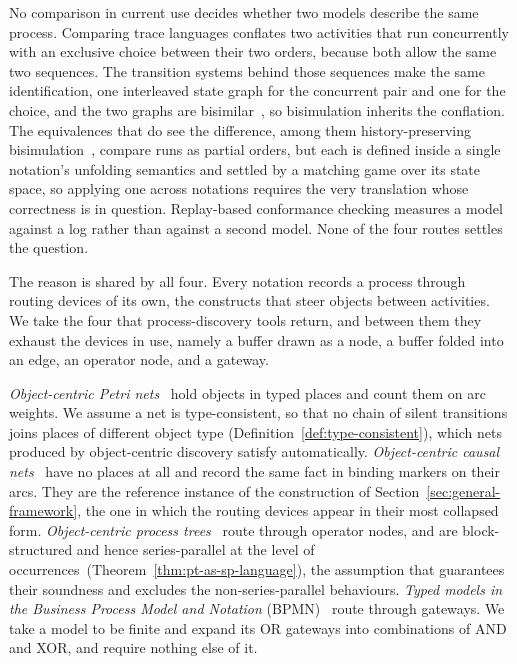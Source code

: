 No comparison in current use decides whether two models describe the same process. Comparing
trace languages conflates two activities that run concurrently with an exclusive choice between
their two orders, because both allow the same two sequences. The transition systems behind those
sequences make the same identification, one interleaved state graph for the concurrent pair and
one for the choice, and the two graphs are
bisimilar~\cite{sassoneModelsConcurrencyClassification1996}, so bisimulation inherits the
conflation. The equivalences that do see the difference, among them history-preserving
bisimulation~\cite{vanglabbeekRefinementActionsEquivalence2001}, compare runs as partial orders,
but each is defined inside a single notation's unfolding semantics and settled by a matching game
over its state space, so applying one across notations requires the very translation whose
correctness is in question. Replay-based conformance checking measures a model against a log
rather than against a second model. None of the four routes settles the question.

The reason is shared by all four. Every notation records a process through routing devices of its
own, the constructs that steer objects between activities. We take the four that
process-discovery tools return, and between them they exhaust the devices in use, namely a buffer drawn
as a node, a buffer folded into an edge, an operator node, and a gateway.

\emph{Object-centric Petri nets}~\cite{vanderaalstDiscoveringObjectCentricPetri2020} hold objects
in typed places and count them on arc weights. We assume a net is type-consistent, so that no chain
of silent transitions joins places of different object type
(Definition~\ref{def:type-consistent}), which nets produced by object-centric discovery satisfy
automatically. \emph{Object-centric causal nets}~\cite{lissObjectCentricCausalNets2025} have no
places at all and record the same fact in binding markers on their arcs. They are the reference
instance of the construction of Section~\ref{sec:general-framework}, the one in which the routing devices appear in their most
collapsed form. \emph{Object-centric process
trees}~\cite{leemansDiscoveringBlockStructuredProcess2013} route through operator nodes, and are
block-structured and hence series-parallel at the level of
occurrences~(Theorem~\ref{thm:pt-as-sp-language}), the assumption that guarantees their soundness and
excludes the non-series-parallel behaviours. \emph{Typed models in the Business Process Model and
Notation} (BPMN)~\cite{BusinessProcessModel} route through gateways. We take a model to be finite
and expand its OR gateways into combinations of AND and XOR, and require nothing else of it.

